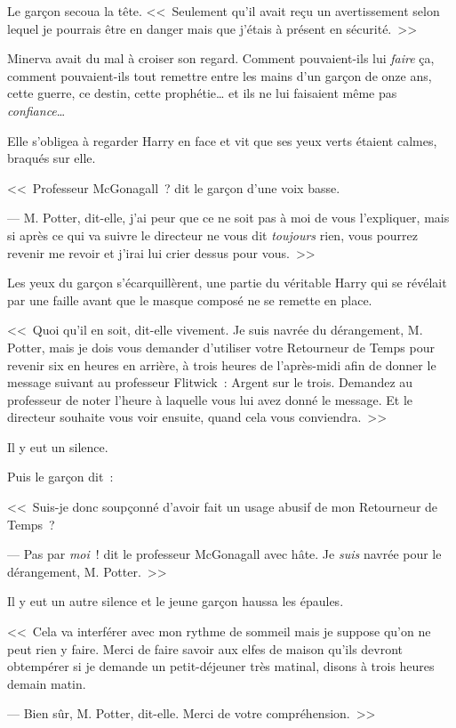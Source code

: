 Le garçon secoua la tête. <<~Seulement qu'il avait reçu un avertissement selon lequel je pourrais être en danger mais que j'étais à présent en sécurité.~>>

Minerva avait du mal à croiser son regard. Comment pouvaient-ils lui \emph{faire} ça, comment pouvaient-ils tout remettre entre les mains d'un garçon de onze ans, cette guerre, ce destin, cette prophétie… et ils ne lui faisaient même pas \emph{confiance}…

Elle s'obligea à regarder Harry en face et vit que ses yeux verts étaient calmes, braqués sur elle.

<<~Professeur McGonagall~? dit le garçon d'une voix basse.

--- M. Potter, dit-elle, j'ai peur que ce ne soit pas à moi de vous l'expliquer, mais si après ce qui va suivre le directeur ne vous dit \emph{toujours} rien, vous pourrez revenir me revoir et j'irai lui crier dessus pour vous.~>>

Les yeux du garçon s'écarquillèrent, une partie du véritable Harry qui se révélait par une faille avant que le masque composé ne se remette en place.

<<~Quoi qu'il en soit, dit-elle vivement. Je suis navrée du dérangement, M. Potter, mais je dois vous demander d'utiliser votre Retourneur de Temps pour revenir six en heures en arrière, à trois heures de l'après-midi afin de donner le message suivant au professeur Flitwick~: Argent sur le trois. Demandez au professeur de noter l'heure à laquelle vous lui avez donné le message. Et le directeur souhaite vous voir ensuite, quand cela vous conviendra.~>>

Il y eut un silence.

Puis le garçon dit~:

<<~Suis-je donc soupçonné d'avoir fait un usage abusif de mon Retourneur de Temps~?

--- Pas par \emph{moi}~! dit le professeur McGonagall avec hâte. Je \emph{suis} navrée pour le dérangement, M. Potter.~>>

Il y eut un autre silence et le jeune garçon haussa les épaules.

<<~Cela va interférer avec mon rythme de sommeil mais je suppose qu'on ne peut rien y faire. Merci de faire savoir aux elfes de maison qu'ils devront obtempérer si je demande un petit-déjeuner très matinal, disons à trois heures demain matin.

--- Bien sûr, M. Potter, dit-elle. Merci de votre compréhension.~>>

